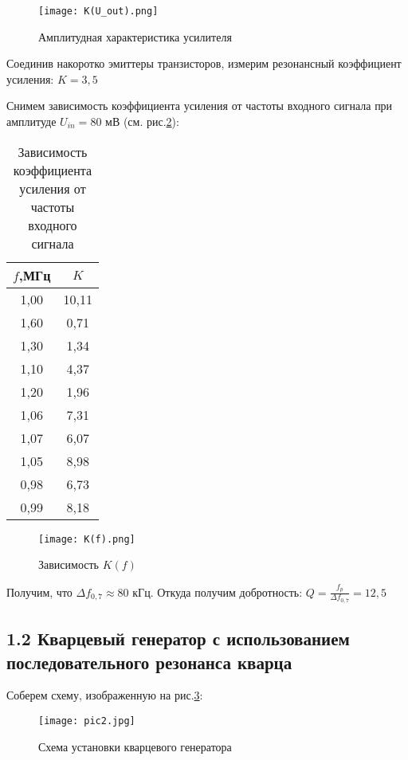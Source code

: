\documentclass[a4paper,12pt]{report}
\begin{document}
\begin{figure}[H]
    \texttt{[image: K(U\_out).png]}
    \caption{Амплитудная характеристика усилителя}
    \label{p2}
\end{figure}

Соединив накоротко эмиттеры транзисторов, измерим резонансный коэффициент усиления: $K = 3,5$

Снимем зависимость коэффициента усиления от частоты входного сигнала при амплитуде $U_{in} = 80$ мВ (см. рис.\ref{p3}):

\begin{table}[H]
\begin{tabular}{|c|c|}
\hline
$f$,МГц & $K$     \\ \hline
1,00  & 10,11 \\ \hline
1,60  & 0,71  \\ \hline
1,30  & 1,34  \\ \hline
1,10  & 4,37  \\ \hline
1,20  & 1,96  \\ \hline
1,06  & 7,31  \\ \hline
1,07  & 6,07  \\ \hline
1,05  & 8,98  \\ \hline
0,98  & 6,73  \\ \hline
0,99  & 8,18  \\ \hline
\end{tabular}
\caption{Зависимость коэффициента усиления от частоты входного сигнала}
\end{table}

\begin{figure}[H]
    \texttt{[image: K(f).png]}
    \caption{Зависимость $K(f)$}
    \label{p3}
\end{figure}

Получим, что $\Delta f_{0,7} \approx 80$ кГц. Откуда получим добротность: $Q = \frac{f_{p}}{\Delta f_{0,7}} = 12,5$

\subsection*{1.2 Кварцевый генератор с использованием последовательного резонанса кварца}

Соберем схему, изображенную на рис.\ref{p4}:

\begin{figure}[H]
    \texttt{[image: pic2.jpg]}
    \caption{Схема установки кварцевого генератора}
    \label{p4}
\end{figure}
\end{document}
